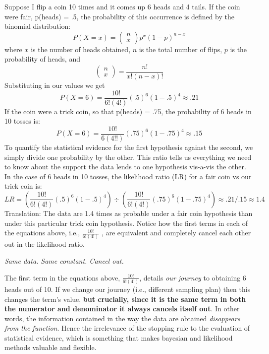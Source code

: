 Suppose I flip a coin 10 times and it comes up 6 heads and 4 tails. If the coin were fair, p(heads) = .5, the probability of this occurrence is defined by the binomial distribution:
\begin{equation}
P(X=x)=
\left(\begin{array}{l}
n \\x\end{array}\right) 
p^{x}(1-p)^{n-x}
\end{equation}
where $x$ is the number of heads obtained, $n$ is the total number of flips, $p$ is the probability of heads, and
\begin{equation}
\left(\begin{array}{l}
n \\x\end{array}\right)
=\frac{n !}{x !(n-x) !}
\end{equation}
Substituting in our values we get
\begin{equation}P(X=6)=\frac{10 !}{6 !(4 !)}(.5)^{6}(1-.5)^{4} \approx .21\end{equation}
If the coin were a trick coin, so that p(heads) = .75, the probability of 6 heads in 10 tosses is:
\begin{equation}P(X=6)=\frac{10 !}{6(4 ! !)}(.75)^{6}(1-.75)^{4} \approx .15\end{equation}
To quantify the statistical evidence for the first hypothesis against the second, we simply divide one probability by the other. This ratio tells us everything we need to know about the support the data lends to one hypothesis vis-a-vis the other.  In the case of 6 heads in 10 tosses, the likelihood ratio (LR) for a fair coin vs our trick coin is:
\begin{equation}L R=\left(\frac{10 !}{6 !(4 !)}(.5)^{6}(1-.5)^{4}\right) \div\left(\frac{10 !}{6 !(4 !)}(.75)^{6}(1-.75)^{4}\right) \approx .21 / .15 \approx 1.4\end{equation}
Translation: The data are 1.4 times as probable under a fair coin hypothesis than under this particular trick coin hypothesis. Notice how the first terms in each of the equations above, i.e., $\frac{10 !}{6 !(4 !)}$ , are equivalent and completely cancel each other out in the likelihood ratio.

\textsl{Same data. Same constant. Cancel out.}

The first term in the equations above, $\frac{10 !}{6 !(4 !)}$, details \textit{our journey} to obtaining 6 heads out of 10. If we change our journey (i.e., different sampling plan) then this changes the term's value, \textbf{but crucially, since it is the same term in both the numerator and denominator it always cancels itself out}. In other words, the information contained in the way the data are obtained \textit{disappears from the function}. Hence the irrelevance of the stopping rule to the evaluation of statistical evidence, which is something that makes bayesian and likelihood methods valuable and flexible.

